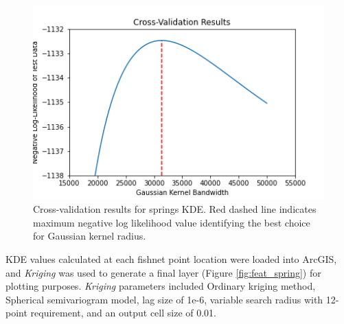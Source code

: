 \begin{figure}[!htp]
\centering
\includegraphics[scale=.50]{templates/images/Figure-Springs_kde_gridsearchcv_result.png}
\caption[Spring density parameter tuning]{Cross-validation results for springs KDE. Red dashed line indicates maximum negative log likelihood value identifying the best choice for Gaussian kernel radius.}
\label{fig:spring_cv}
\end{figure}

KDE values calculated at each fishnet point location were loaded into ArcGIS, and \textit{Kriging} was used to generate a final layer (Figure \ref{fig:feat_spring}) for plotting purposes. \textit{Kriging} parameters included Ordinary kriging method, Spherical semivariogram model, lag size of 1e-6, variable search radius with 12-point requirement, and an output cell size of 0.01. 

